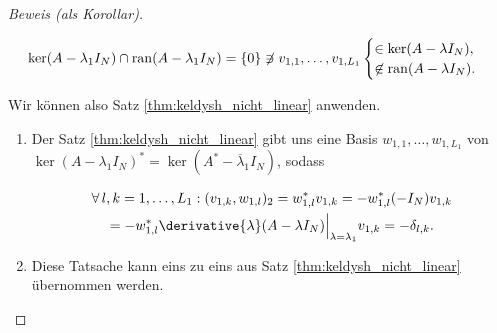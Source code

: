 \begin{proof}[Beweis (als Korollar)]
\begin{enumerate}[label = \arabic*.]
        \begin{align*}
            \ker (A - \lambda_1 I_N) \cap \operatorname{ran} (A - \lambda_1 I_N)
            =
            {\left \{ 0 \right \}}
            \not \ni
            v_{1, 1}, \dots, v_{1, L_1}
            \begin{cases}
                     \in \ker (A - \lambda I_N), \\
                \not \in \operatorname{ran} (A - \lambda I_N).
            \end{cases}
        \end{align*}

    \end{enumerate}

    Wir können also Satz \ref{thm:keldysh_nicht_linear} anwenden.

    \begin{enumerate}[label = (\roman*), start = 2]

        \item Der Satz \ref{thm:keldysh_nicht_linear} gibt uns eine Basis $w_{1, 1}, \dots, w_{1, L_1}$ von $\ker (A - \lambda_1 I_N)^\ast = \ker (A^\ast - \overline \lambda_1 I_N)$, sodass

        \begin{multline*}
            \Forall l, k = 1, \dots, L_1:
                (v_{1, k}, w_{1, l})_2
                =
                w_{1, l}^\ast v_{1, k}
                =
                -w_{1, l}^\ast (-I_N) v_{1, k} \\
                =
                -w_{1, l}^\ast \derivative{\lambda}(A - \lambda I_N) \Big |_{\lambda = \lambda_1} v_{1, k}
                =
                -\delta_{l, k}.
        \end{multline*}

        \item Diese Tatsache kann eins zu eins aus Satz \ref{thm:keldysh_nicht_linear} übernommen werden.

    \end{enumerate}

\end{proof}
